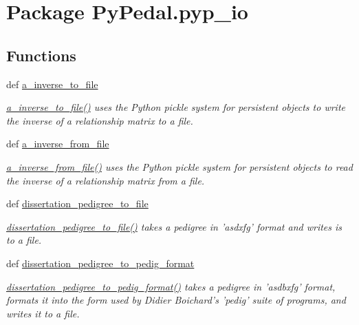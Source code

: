 \hypertarget{namespacePyPedal_1_1pyp__io}{
\section{Package Py\-Pedal.pyp\_\-io}
\label{namespacePyPedal_1_1pyp__io}
}


\subsection*{Functions}
\begin{CompactItemize}
\item 
def \hyperlink{namespacePyPedal_1_1pyp__io_589906b4f0fdebb5b6c29e836c92b33c}{a\_\-inverse\_\-to\_\-file}
\begin{CompactList}\small\item\em \hyperlink{namespacePyPedal_1_1pyp__io_589906b4f0fdebb5b6c29e836c92b33c}{a\_\-inverse\_\-to\_\-file()} uses the Python pickle system for persistent objects to write the inverse of a relationship matrix to a file. \item\end{CompactList}\item 
def \hyperlink{namespacePyPedal_1_1pyp__io_452990288b79b685e851e35e9f248c77}{a\_\-inverse\_\-from\_\-file}
\begin{CompactList}\small\item\em \hyperlink{namespacePyPedal_1_1pyp__io_452990288b79b685e851e35e9f248c77}{a\_\-inverse\_\-from\_\-file()} uses the Python pickle system for persistent objects to read the inverse of a relationship matrix from a file. \item\end{CompactList}\item 
def \hyperlink{namespacePyPedal_1_1pyp__io_bf331c3be82531c8de2e408951d2001b}{dissertation\_\-pedigree\_\-to\_\-file}
\begin{CompactList}\small\item\em \hyperlink{namespacePyPedal_1_1pyp__io_bf331c3be82531c8de2e408951d2001b}{dissertation\_\-pedigree\_\-to\_\-file()} takes a pedigree in 'asdxfg' format and writes is to a file. \item\end{CompactList}\item 
def \hyperlink{namespacePyPedal_1_1pyp__io_65f88cf8cb03f8633403511e20b664a1}{dissertation\_\-pedigree\_\-to\_\-pedig\_\-format}
\begin{CompactList}\small\item\em \hyperlink{namespacePyPedal_1_1pyp__io_65f88cf8cb03f8633403511e20b664a1}{dissertation\_\-pedigree\_\-to\_\-pedig\_\-format()} takes a pedigree in 'asdbxfg' format, formats it into the form used by Didier Boichard's 'pedig' suite of programs, and writes it to a file. \item\end{CompactList}\item 

\end{CompactItemize}
